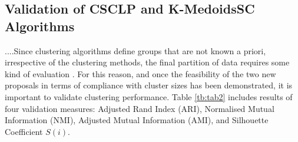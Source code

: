 \documentclass[procedia]{easychair}
\begin{document}
\subsection{Validation of CSCLP and K-MedoidsSC Algorithms}
\label{sect:validation}

....Since clustering algorithms define groups that are not known a priori, irrespective of the clustering methods, the final partition of data requires some kind of evaluation \cite{Halkidi:2001}. For this reason, and once the feasibility of the two new proposals in terms of compliance with cluster sizes has been demonstrated, it is important to validate clustering performance. Table \ref{tb:tab2} includes results of four validation measures: Adjusted Rand Index (ARI), Normalised Mutual Information (NMI), Adjusted Mutual Information (AMI), and Silhouette Coefficient $S(i)$.
\end{document}
